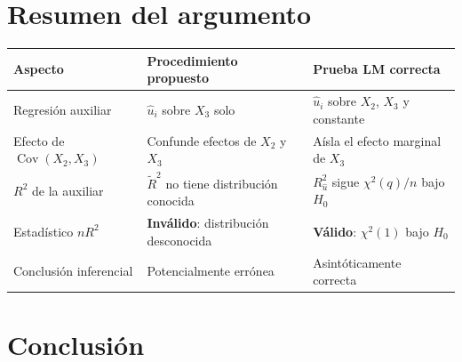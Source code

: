 \documentclass[12pt,letterpaper]{article}
\newcommand{\Cov}{\operatorname{Cov}}
\begin{document}
\section{Resumen del argumento}

\begin{center}
\renewcommand{\arraystretch}{1.5}
\begin{tabular}{p{4.5cm}p{4.8cm}p{4.8cm}}
\toprule
\textbf{Aspecto}
  & \textbf{Procedimiento propuesto}
  & \textbf{Prueba LM correcta} \\
\midrule
Regresión auxiliar
  & $\hat{u}_{i}$ sobre $X_{3}$ solo
  & $\hat{u}_{i}$ sobre $X_{2}$, $X_{3}$ y constante \\
Efecto de $\Cov(X_{2},X_{3})$
  & Confunde efectos de $X_{2}$ y $X_{3}$
  & Aísla el efecto marginal de $X_{3}$ \\
$R^{2}$ de la auxiliar
  & $\tilde{R}^{2}$ no tiene distribución conocida
  & $R^{2}_{\hat{u}}$ sigue $\chi^{2}(q)/n$ bajo $H_{0}$ \\
Estadístico $n R^{2}$
  & \textbf{Inválido}: distribución desconocida
  & \textbf{Válido}: $\chi^{2}(1)$ bajo $H_{0}$ \\
Conclusión inferencial
  & Potencialmente errónea
  & Asintóticamente correcta \\
\bottomrule
\end{tabular}
\end{center}

\section{Conclusión}
\end{document}
